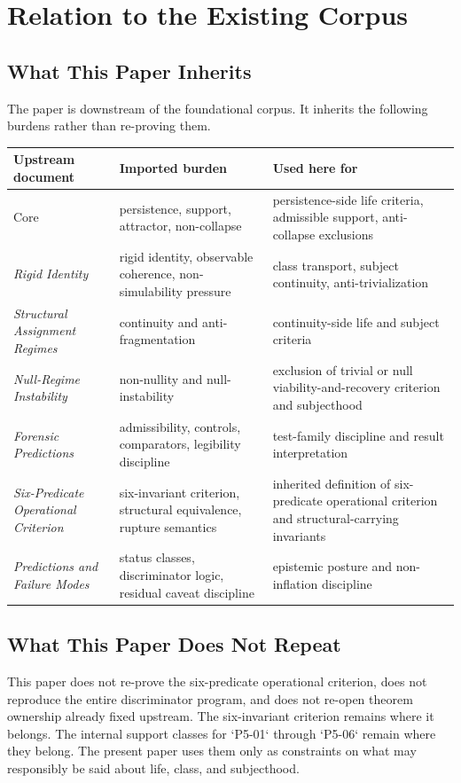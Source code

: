 \documentclass[11pt,a4paper]{article}
\theoremstyle{definition}
\begin{document}
\section{Relation to the Existing Corpus}
\subsection{What This Paper Inherits}
The paper is downstream of the foundational corpus. It inherits the following burdens rather than re-proving them.

\begin{center}
\renewcommand{\arraystretch}{1.16}
\setlength{\tabcolsep}{4.5pt}
\begin{tabularx}{\linewidth}{@{}lY Y@{}}
\toprule
Upstream document & Imported burden & Used here for \\
\midrule
Core \cite{core} & persistence, support, attractor, non-collapse & persistence-side life criteria, admissible support, anti-collapse exclusions \\
\textit{Rigid Identity} \cite{paper1} & rigid identity, observable coherence, non-simulability pressure & class transport, subject continuity, anti-trivialization \\
\textit{Structural Assignment Regimes} \cite{paper2} & continuity and anti-fragmentation & continuity-side life and subject criteria \\
\textit{Null-Regime Instability} \cite{paper3} & non-nullity and null-instability & exclusion of trivial or null viability-and-recovery criterion and subjecthood \\
\textit{Forensic Predictions} \cite{paper4} & admissibility, controls, comparators, legibility discipline & test-family discipline and result interpretation \\
\textit{Six-Predicate Operational Criterion} \cite{paper5} & six-invariant criterion, structural equivalence, rupture semantics & inherited definition of six-predicate operational criterion and structural-carrying invariants \\
\textit{Predictions and Failure Modes} & status classes, discriminator logic, residual caveat discipline & epistemic posture and non-inflation discipline \\
\bottomrule
\end{tabularx}
\end{center}

\subsection{What This Paper Does Not Repeat}
This paper does not re-prove the six-predicate operational criterion, does not reproduce the entire discriminator program, and does not re-open theorem ownership already fixed upstream. The six-invariant criterion remains where it belongs. The internal support classes for `P5-01` through `P5-06` remain where they belong. The present paper uses them only as constraints on what may responsibly be said about life, class, and subjecthood.
\end{document}
